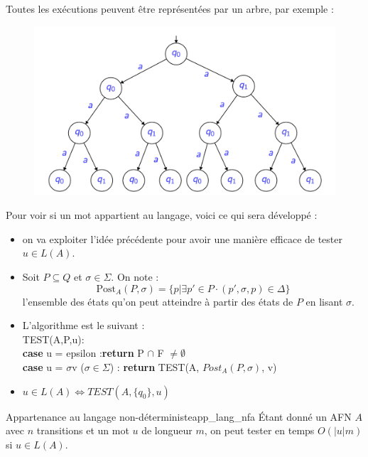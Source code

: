 Toutes les exécutions peuvent être représentées par un arbre, par exemple :
\begin{figure}[H]
    \centering
    \includegraphics[scale = 0.5]{pictures/arbre_executions.png}
\end{figure}
Pour voir si un mot appartient au langage, voici ce qui sera développé :
\begin{itemize}[label=\textbullet]
    \item on va exploiter l'idée précédente pour avoir une manière efficace de tester $u \in L(A)$.
    \item Soit $P \subseteq Q$ et $\sigma \in \Sigma$. On note :
    \begin{equation*}
        \text{Post}_A(P, \sigma) = \{p | \exists p' \in P \cdot (p', \sigma, p) \in \Delta\}
    \end{equation*}
    l'ensemble des états qu'on peut atteindre à partir des états de $P$ en lisant $\sigma$.
    \item L'algorithme est le suivant :\\
        TEST(A,P,u):\\
            \indent\hspace{1cm} \textbf{case} u = epsilon :\textbf{return} P $\cap$ F $\neq \emptyset$\\
            \indent\hspace{1cm} \textbf{case} u = $\sigma$v ($\sigma\in\Sigma$) : \textbf{return} TEST(A, $Post_A(P,\sigma)$, v)
    \item $u\in L(A) \Leftrightarrow TEST(A, \{q_0\}, u)$
\end{itemize}
\begin{theorem}{Appartenance au langage non-déterministe}{app_lang_nfa}
    Étant donné un AFN $A$ avec $n$ transitions et un mot $u$ de longueur $m$, on peut tester en temps $O(|u|m)$ si $u \in L(A)$.
\end{theorem}
